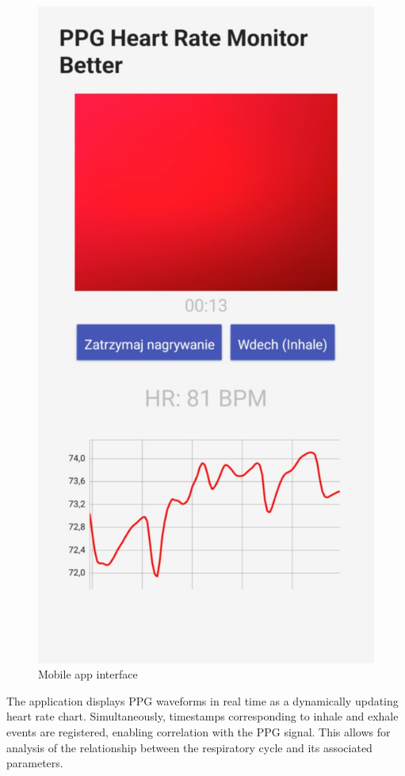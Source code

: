 \documentclass{citask}
\begin{document}
\begin{figure}[htbp]
    \centering
    \includegraphics[scale=0.17]{images/aplikacja.png}
    \caption{Mobile app interface}
    \label{fig:aplikacja_mobilna}
\end{figure}


The application displays PPG waveforms in real time as a dynamically updating heart rate chart. Simultaneously, timestamps corresponding to inhale and exhale events are registered, enabling correlation with the PPG signal. This allows for analysis of the relationship between the respiratory cycle and its associated parameters.
\end{document}

